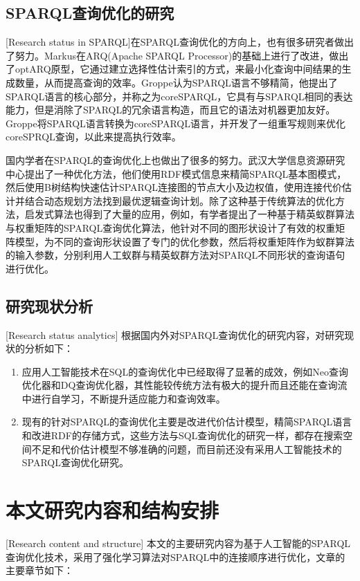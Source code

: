 \subsection{SPARQL查询优化的研究}[Research status in SPARQL]在SPARQL查询优化的方向上，也有很多研究者做出了努力。Markus在ARQ(Apache SPARQL Processor)的基础上进行了改进\cite{OptARQ}，做出了optARQ原型，它通过建立选择性估计索引的方式，来最小化查询中间结果的生成数量，从而提高查询的效率。Groppe认为SPARQL语言不够精简\cite{coreSPARQL}，他提出了SPARQL语言的核心部分，并称之为coreSPARQL，它具有与SPARQL相同的表达能力，但是消除了SPARQL的冗余语言构造，而且它的语法对机器更加友好。Groppe将SPARQL语言转换为coreSPARQL语言，并开发了一组重写规则来优化coreSPRQL查询，以此来提高执行效率。

国内学者在SPARQL的查询优化上也做出了很多的努力。武汉大学信息资源研究中心提出了一种优化方法\cite{XuLei}，他们使用RDF模式信息来精简SPARQL基本图模式，然后使用B树结构快速估计SPARQL连接图的节点大小及边权值，使用连接代价估计并结合动态规划方法找到最优逻辑查询计划。除了这种基于传统算法的优化方法，启发式算法也得到了大量的应用，例如，有学者提出了一种基于精英蚁群算法与权重矩阵的SPARQL查询优化算法\cite{精英蚁群}，他针对不同的图形状设计了有效的权重矩阵模型，为不同的查询形状设置了专门的优化参数，然后将权重矩阵作为蚁群算法的输入参数，分别利用人工蚁群与精英蚁群方法对SPARQL不同形状的查询语句进行优化。

\subsection{研究现状分析}[Research status analytics]
根据国内外对SPARQL查询优化的研究内容，对研究现状的分析如下：
\begin{enumerate}
    \item 应用人工智能技术在SQL的查询优化中已经取得了显著的成效，例如Neo查询优化器和DQ查询优化器，其性能较传统方法有极大的提升而且还能在查询流中进行自学习，不断提升适应能力和查询效率。
    \item 现有的针对SPARQL的查询优化主要是改进代价估计模型，精简SPARQL语言和改进RDF的存储方式，这些方法与SQL查询优化的研究一样，都存在搜索空间不足和代价估计模型不够准确的问题，而目前还没有采用人工智能技术的SPARQL查询优化研究。
\end{enumerate}


\section{本文研究内容和结构安排}[Research content and structure]
本文的主要研究内容为基于人工智能的SPARQL查询优化技术，采用了强化学习算法对SPARQL中的连接顺序进行优化，文章的主要章节如下：

